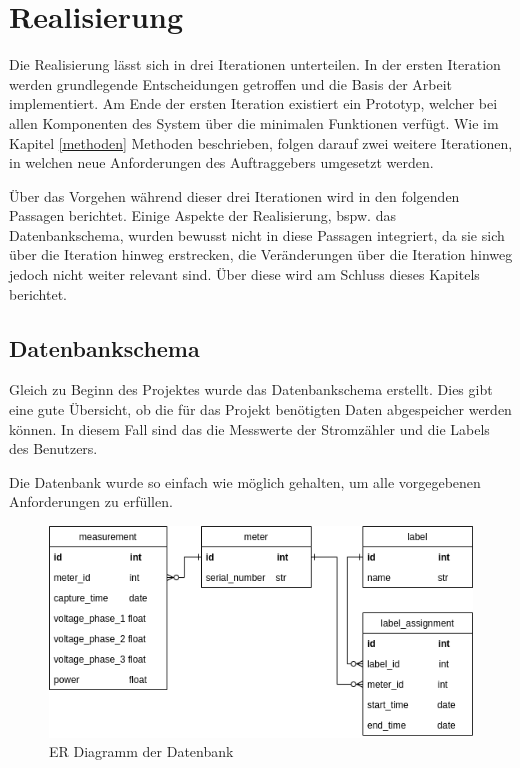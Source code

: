 \chapter{Realisierung}


Die Realisierung lässt sich in drei Iterationen unterteilen.
In der ersten Iteration werden grundlegende Entscheidungen getroffen und die Basis der Arbeit implementiert.
Am Ende der ersten Iteration existiert ein Prototyp,
welcher bei allen Komponenten des System über die minimalen Funktionen verfügt.
Wie im Kapitel \ref{methoden} Methoden beschrieben, folgen darauf zwei weitere Iterationen,
in welchen neue Anforderungen des Auftraggebers umgesetzt werden.

Über das Vorgehen während dieser drei Iterationen wird in den folgenden Passagen berichtet.
Einige Aspekte der Realisierung, bspw. das Datenbankschema,  wurden bewusst nicht in diese Passagen integriert,
da sie sich über die Iteration hinweg erstrecken,
die Veränderungen über die Iteration hinweg jedoch nicht weiter relevant sind.
Über diese wird am Schluss dieses Kapitels berichtet.


\newpage

\newpage

\newpage

\section{Datenbankschema}


\label{rel:db}
Gleich zu Beginn des Projektes wurde das Datenbankschema erstellt.
Dies gibt eine gute Übersicht, ob die für das Projekt benötigten Daten
abgespeicher werden können. In diesem Fall sind das die Messwerte der Stromzähler
und die Labels des Benutzers.

Die Datenbank wurde so einfach wie möglich gehalten, um alle vorgegebenen
Anforderungen zu erfüllen.

\begin{figure}[H]
    \centering
    \includegraphics[width=1.0\textwidth]{gfx/smic-db}
    \caption{
        ER Diagramm der Datenbank
    }
    \label{fig:smic-db}
\end{figure}

